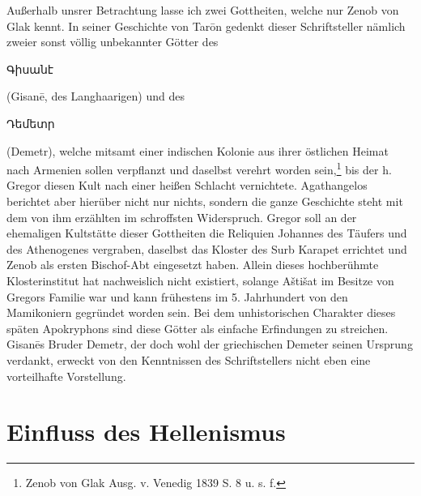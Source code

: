 \documentclass{article}
\begin{document}
Außerhalb unsrer Betrachtung lasse ich zwei Gottheiten, welche nur Zenob von Glak kennt. In seiner Geschichte von Tarōn gedenkt dieser Schriftsteller nämlich zweier sonst völlig unbekannter Götter des \begin{armenian}Գիսանէ\end{armenian} (Gisanē, des Langhaarigen) und des \begin{armenian}Դեմետր\end{armenian} (Demetr), welche mitsamt einer indischen Kolonie aus ihrer östlichen Heimat nach Armenien sollen verpflanzt und daselbst verehrt worden sein,\footnote{Zenob von Glak Ausg. v. Venedig 1839 S. 8 u. s. f.} bis der h. Gregor diesen Kult nach einer heißen Schlacht vernichtete. Agathangelos berichtet aber hierüber nicht nur nichts, sondern die ganze Geschichte steht mit dem von ihm erzählten im schroffsten Widerspruch. Gregor soll an der ehemaligen Kultstätte dieser Gottheiten die Reliquien Johannes des Täufers und des Athenogenes vergraben, daselbst das Kloster des Surb Karapet errichtet und Zenob als ersten Bischof-Abt eingesetzt haben. Allein dieses hochberühmte Klosterinstitut hat nachweislich nicht existiert, solange Aštišat im Besitze von Gregors Familie war und kann frühestens im 5. Jahrhundert von den Mamikoniern gegründet worden sein. Bei dem unhistorischen Charakter dieses späten Apokryphons sind diese Götter als einfache Erfindungen zu streichen. Gisanēs Bruder Demetr, der doch wohl der griechischen Demeter seinen Ursprung verdankt, erweckt von den Kenntnissen des Schriftstellers nicht eben eine vorteilhafte Vorstellung.
\clearpage
\section{Einfluss des Hellenismus}
\end{document}
